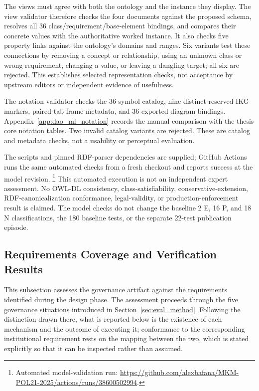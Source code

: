 \documentclass[journal]{IEEEtran}
\begin{document}
The views must agree with both the ontology and the instance they display.
The view validator therefore checks the four documents against the proposed
schema, resolves all 36 class/requirement/base-element bindings, and compares
their concrete values with the authoritative worked instance. It also
checks five property links against the ontology's domains and ranges.
Six variants test these connections by removing a concept or relationship,
using an unknown class or wrong requirement, changing a value, or leaving
a dangling target; all six are rejected. This establishes selected
representation checks, not acceptance by upstream editors or independent
evidence of usefulness.

The notation validator checks the 36-symbol catalog, nine
distinct reserved IKG markers, paired-tab frame metadata, and
36 exported diagram bindings. Appendix~\ref{app:dao_ml_notation}
records the manual comparison with the thesis core notation tables. Two invalid
catalog variants are rejected. These are catalog and metadata
checks, not a usability or perceptual evaluation.

The scripts and pinned RDF-parser dependencies are supplied;
GitHub Actions runs the same automated checks from a fresh checkout
and reports success at the model revision.
\footnote{Automated model-validation run:
\url{https://github.com/alexbafana/MKM-POL21-2025/actions/runs/38600502994}.}
This automated execution is not an independent expert
assessment. No OWL-DL consistency, class-satisfiability,
conservative-extension, RDF-canonicalization conformance,
legal-validity, or production-enforcement result is claimed.
The model checks do not change the baseline 2 E, 16 P, and
18 N classifications, the 180 baseline tests, or the separate
22-test publication episode.

\subsection{Requirements Coverage and Verification Results}
\label{sec:capability_assessment}

This subsection assesses the governance artifact against the
requirements identified during the design phase. The assessment
proceeds through the five governance situations introduced in
Section~\ref{sec:eval_method}. Following the distinction drawn there,
what is reported below is the existence of each mechanism and the
outcome of executing it; conformance to the corresponding institutional
requirement rests on the mapping between the two, which is stated
explicitly so that it can be inspected rather than assumed.
\end{document}

